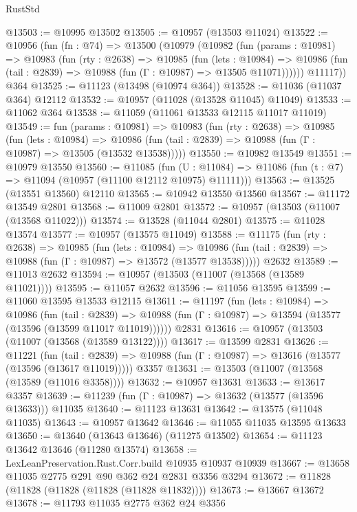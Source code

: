 \begin{lexlean}{RustStd}
\begin{coremodule}
@13503 := @10995 @13502
@13505 := @10957 (@13503 @11024)
@13522 := @10956
    (fun (fn : @74) =>
    @13500
      (@10979
        (@10982
          (fun (params : @10981) =>
          @10983
            (fun (rty : @2638) =>
            @10985
              (fun (lets : @10984) =>
              @10986 (fun (tail : @2839) => @10988 (fun (Γ : @10987) => @13505 @11071))))))
        @11117))
    @364
@13525 := @11123 (@13498 (@10974 @364))
@13528 := @11036 (@11037 @364) @12112
@13532 := @10957 (@11028 (@13528 @11045) @11049)
@13533 := @11062 @364
@13538 := @11059 (@11061 @13533 @12115 @11017 @11019)
@13549 := fun (params : @10981) =>
  @10983
    (fun (rty : @2638) =>
    @10985
      (fun (lets : @10984) =>
      @10986 (fun (tail : @2839) => @10988 (fun (Γ : @10987) => @13505 (@13532 @13538)))))
@13550 := @10982 @13549
@13551 := @10979 @13550
@13560 := @11085
    (fun (U : @11084) => @11086 (fun (t : @7) => @11094 (@10957 (@11100 @12112 @10975) @11111)))
@13563 := @13525 (@13551 @13560) @12110
@13565 := @10942 @13550 @13560
@13567 := @11172 @13549 @2801
@13568 := @11009 @2801
@13572 := @10957 (@13503 (@11007 (@13568 @11022)))
@13574 := @13528 (@11044 @2801)
@13575 := @11028 @13574
@13577 := @10957 (@13575 @11049)
@13588 := @11175
    (fun (rty : @2638) =>
    @10985
      (fun (lets : @10984) =>
      @10986 (fun (tail : @2839) => @10988 (fun (Γ : @10987) => @13572 (@13577 @13538)))))
    @2632
@13589 := @11013 @2632
@13594 := @10957 (@13503 (@11007 (@13568 (@13589 @11021))))
@13595 := @11057 @2632
@13596 := @11056 @13595
@13599 := @11060 @13595 @13533 @12115
@13611 := @11197
    (fun (lets : @10984) =>
    @10986
      (fun (tail : @2839) =>
      @10988 (fun (Γ : @10987) => @13594 (@13577 (@13596 (@13599 @11017 @11019))))))
    @2831
@13616 := @10957 (@13503 (@11007 (@13568 (@13589 @13122))))
@13617 := @13599 @2831
@13626 := @11221
    (fun (tail : @2839) => @10988 (fun (Γ : @10987) => @13616 (@13577 (@13596 (@13617 @11019)))))
    @3357
@13631 := @13503 (@11007 (@13568 (@13589 (@11016 @3358))))
@13632 := @10957 @13631
@13633 := @13617 @3357
@13639 := @11239 (fun (Γ : @10987) => @13632 (@13577 (@13596 @13633))) @11035
@13640 := @11123 @13631
@13642 := @13575 (@11048 @11035)
@13643 := @10957 @13642
@13646 := @11055 @11035 @13595 @13633
@13650 := @13640 (@13643 @13646) (@11275 @13502)
@13654 := @11123 @13642 @13646 (@11280 @13574)
@13658 := LexLeanPreservation.Rust.Corr.build @10935 @10937 @10939
@13667 := @13658 @11035 @2775 @291 @90 @362 @24 @2831 @3356 @3294
@13672 := @11828 (@11828 (@11828 (@11828 (@11828 @11832))))
@13673 := @13667 @13672
@13678 := @11793 @11035 @2775 @362 @24 @3356

\end{coremodule}
\end{lexlean}
